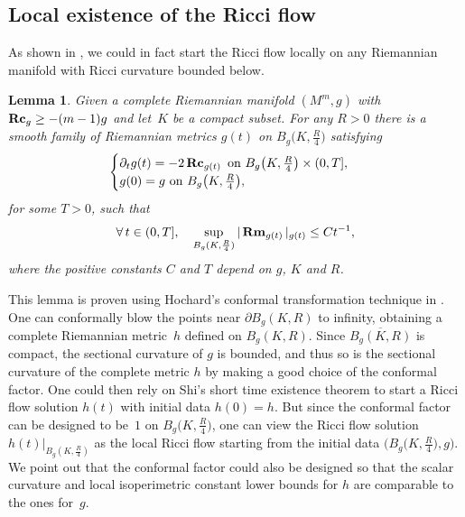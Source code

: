 \documentclass[pdftex]{sigma}
\numberwithin{equation}{section}
\newtheorem{Lemma}[Theorem]{Lemma}
\newcommand{\Rm}{\operatorname{\bf Rm}}
\newcommand{\Rc}{\operatorname{\bf Rc}}
\begin{document}
\subsection{Local existence of the Ricci flow}\label{section4.1}
As shown in \cite[Lemma 2.2]{HW20b}, we could in fact start the Ricci flow
locally on any Riemannian manifold with Ricci curvature bounded below.
\begin{Lemma}\label{lem: HW20b0}
Given a complete Riemannian manifold $(M^m,g)$ with $\Rc_g\ge -(m-1)g$ and let~$K$ be a compact subset. For any $R>0$ there is a smooth family of Riemannian
metrics $g(t)$ on $B_g\big(K,\frac{R}{4}\big)$ satisfying
\begin{align*}
\begin{cases}
\partial_tg(t) = -2\Rc_{g(t)}\ \text{on}\ B_g\big(K,\frac{R}{4}\big)\times (0,T],\\
g(0) = g\ \text{on}\ B_g\big(K,\frac{R}{4}\big),
\end{cases}
\end{align*}
for some $T>0$, such that
\begin{align*}
\forall\, t\in (0,T],\quad
\sup_{B_g(K,\frac{R}{4})} |\Rm_{g(t)} |_{g(t)} \le Ct^{-1},
\end{align*}
where the positive constants $C$ and $T$ depend on $g$, $K$ and $R$.
\end{Lemma}
This lemma is proven using Hochard's conformal transformation technique in
\cite[Section~6]{Hochard16}. One can conformally blow the points near $\partial
B_g(K,R)$ to infinity, obtaining a complete Riemannian metric~$h$ defined on
$B_g(K,R)$. Since $\overline{B_g(K,R)}$ is compact, the sectional curvature of
$g$ is bounded, and thus so is the sectional curvature of the complete metric
$h$ by making a good choice of the conformal factor. One could then rely on
Shi's short time existence theorem to start a Ricci flow solution $h(t)$ with
initial data $h(0)=h$. But since the conformal factor can be designed to be~$1$
on $B_g\big(K,\frac{R}{4}\big)$, one can view the Ricci flow solution
$h(t)|_{B_g(K,\frac{R}{4})}$ as the local Ricci flow starting from the initial
data $\big(B_g\big(K,\frac{R}{4}\big),g\big)$. We point out that the conformal factor could
also be designed so that the scalar curvature and local isoperimetric constant
lower bounds for $h$ are comparable to the ones for~$g$.
\end{document}
